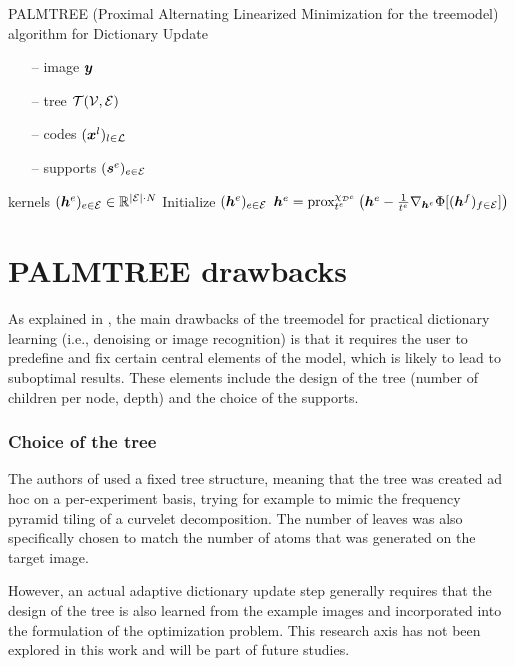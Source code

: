 \begin{algorithm}[!ht]
    \caption{\ac{PALMTREE} (Proximal Alternating Linearized Minimization for the \gls{treemodel}) algorithm for Dictionary Update}\label{alg_palmtree}
  \begin{algorithmic}[1]
    \Input
    \begin{itemize}
    	\item[--] image $\bm{y}$
    	\item[--] tree $\mathcal T(\mathcal V,\mathcal E)$
    	\item[--] codes $(\bm{x}^l)_{l \in \mathcal L}$
    	\item[--] supports $(\bm{s}^e)_{e \in \mathcal E}$
    \end{itemize}
    \Output kernels $(\bm{h}^e)_{e \in \mathcal E} \in \mathbb{R}^{|\mathcal E| \cdot N}$
    \State Initialize $(\bm{h}^e)_{e \in \mathcal E}$
      	\State $\bm{h}^e = \text{prox}^{\chi_{{\mathcal D}^e}}_{t^e} \left(\bm{h}^e-\frac{1}{t^e} \nabla_{\bm{h}^e} \Phi[(\bm{h}^f)_{f \in \mathcal E}] \right)$
      \EndFor
    \EndWhile
  \end{algorithmic}
\end{algorithm}


\section{PALMTREE drawbacks}
As explained in \cite[p. 23]{chabiron_optimization_2016}, the main drawbacks of the \gls{treemodel} for practical dictionary learning (i.e., denoising or image recognition) is that it requires the user to predefine and fix certain central elements of the model, which is likely to lead to suboptimal results. These elements include the design of the tree (number of children per node, depth) and the choice of the supports.
\subsubsection{Choice of the tree}
The authors of \cite{chabiron_optimization_2016} used a fixed tree structure, meaning that the tree was created ad hoc on a per-experiment basis, trying for example to mimic the frequency pyramid tiling of a curvelet decomposition. The number of leaves was also specifically chosen to match the number of atoms that was generated on the target image.

\noindent
However, an actual adaptive dictionary update step generally requires that the design of the tree is also learned from the example images and incorporated into the formulation of the optimization problem. This research axis has not been explored in this work and will be part of future studies.

